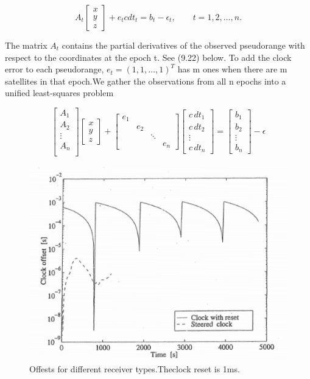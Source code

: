 	\begin{equation}\label{eq:9.1}
		A_t 
		\begin{bmatrix}
		x \\	y \\	z
		\end{bmatrix}
		+e_tcdt_t=b_t-\epsilon _t,\qquad t = 1,2,\ldots ,n.
	\end{equation}
	
	The matrix $A_t$ contains the partial derivatives of the observed pseudorange with respect to the coordinates at the epoch t. See (9.22) below. To add the clock error to each pseudorange, $e_t = (1, 1,\ldots ,1 )^T$ has m ones when there are m satellites in that epoch.We gather the observations from all n epochs into a unified least-squares problem
	
	\begin{equation}\label{eq:9.2}
		\begin{bmatrix}
		A_1 \\	A_2 \\	\vdots \\	A_n \\
		\end{bmatrix}
		\begin{bmatrix}
		x \\	y \\	z 
		\end{bmatrix}
		+		
		\begin{bmatrix}
		e_1 & & & \\
		& e_2 & & \\	
		& & \ddots & \\	
		& & & e_n  
		\end{bmatrix}
		\begin{bmatrix}
		c\,dt_1 \\	
		c\,dt_2 \\	
		\vdots \\	
		c\,dt_n
		\end{bmatrix}
		=\begin{bmatrix}
		b_1 \\ b_2 \\ \vdots \\ b_n
		\end{bmatrix}
		-
		\epsilon
	\end{equation}
	\begin{figure}
		\centering
		\includegraphics[width=0.7\linewidth]{TeX_files/Part03/chapter09/image/9-4}
		\caption{Offests for different receiver types.Theclock reset is 1ms.}
		\label{fig:9-4}
	\end{figure}

